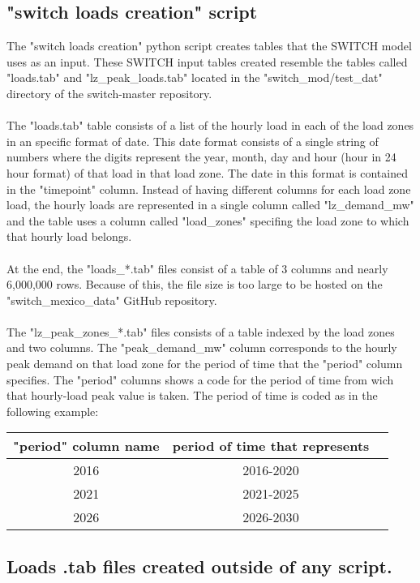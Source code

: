 \documentclass{article}
\begin{document}
\subsection{"switch loads creation" script}
The "switch loads creation" python script creates tables that the SWITCH model uses as an input. These SWITCH input tables created resemble the tables called "loads.tab" and "lz\_peak\_loads.tab" located in the "switch\_mod/test\_dat" directory of the switch-master repository\cite{gitrepo}.
\\
\\The "loads.tab" table consists of a list of the hourly load in each of the load zones in an specific format of date. This date format consists of a single string of numbers where the digits represent the year, month, day and hour (hour in 24 hour format) of that load in that load zone. The date in this  format is contained in the "timepoint" column. Instead of having different columns for each load zone load, the hourly loads are represented in a single column called "lz\_demand\_mw" and the table uses a column called "load\_zones" specifing the load zone to which that hourly load belongs.
\\
\\At the end, the "loads\_*.tab" files consist of a table of 3 columns and nearly 6,000,000 rows. Because of this, the file size is too large to be hosted on the "switch\_mexico\_data" GitHub repository.
\\
\\The "lz\_peak\_zones\_*.tab" files consists of a table indexed by the load zones and two columns. The "peak\_demand\_mw" column corresponds to the hourly peak demand on that load zone for the period of time that the "period" column specifies. The "period" columns shows a code for the period of time from wich that hourly-load peak value is taken. The period of time is coded as in the following example:
\begin{table}[h!]
\centering
\begin{tabular}{ | c| c| c| }
\hline
"period" column name & period of time that represents \\
\hline
2016 & 2016-2020 \\ \hline
2021 & 2021-2025 \\ \hline
2026 & 2026-2030 \\ \hline
\end{tabular} 
\end{table}
\subsection{Loads .tab files created outside of any script.}
  
\end{document}

